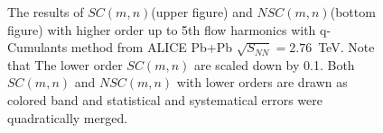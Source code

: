 	\begin{figure}[hp]
		\begin{center}
        \caption{The results of $SC(m,n)$(upper figure) and $NSC(m,n)$(bottom figure) with higher order up to 5th flow harmonics with q-Cumulants method from ALICE Pb+Pb $\sqrt{S_{NN}}=2.76$~TeV. Note that The lower order $SC(m,n)$ are scaled down by 0.1. Both $SC(m,n)$ and $NSC(m,n)$ with lower orders are drawn as colored band and statistical and systematical errors were quadratically merged. }
        \label{fig:highersc}
        \end{center}   
     \end{figure}


